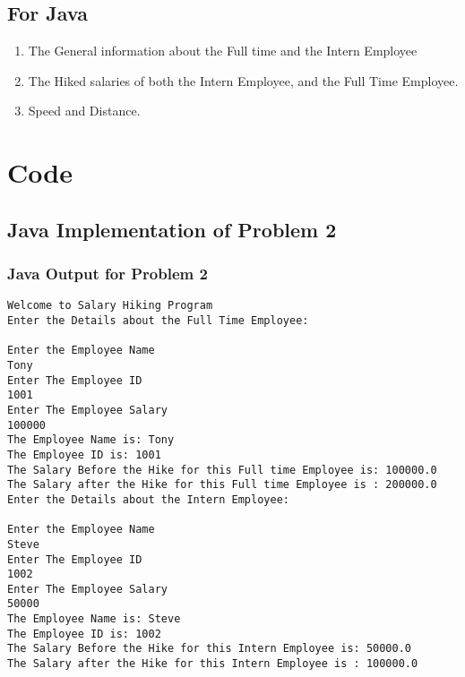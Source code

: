 \documentclass[11pt]{article}
\begin{document}
\subsection*{For Java}
\begin{enumerate}
	\item The General information about the Full time and the Intern Employee
	\item The Hiked salaries of both the Intern Employee, and the Full Time Employee.
	\item Speed and Distance.
\end{enumerate}


\section{Code}

\subsection{Java Implementation of Problem 2}






\subsubsection{Java Output for Problem 2}
\begin{lstlisting}[caption=Java Output for Problem 2]
Welcome to Salary Hiking Program
Enter the Details about the Full Time Employee:

Enter the Employee Name
Tony
Enter The Employee ID
1001
Enter The Employee Salary
100000
The Employee Name is: Tony
The Employee ID is: 1001
The Salary Before the Hike for this Full time Employee is: 100000.0
The Salary after the Hike for this Full time Employee is : 200000.0
Enter the Details about the Intern Employee:

Enter the Employee Name
Steve
Enter The Employee ID
1002
Enter The Employee Salary
50000
The Employee Name is: Steve
The Employee ID is: 1002
The Salary Before the Hike for this Intern Employee is: 50000.0
The Salary after the Hike for this Intern Employee is : 100000.0
\end{lstlisting}
\end{document}
